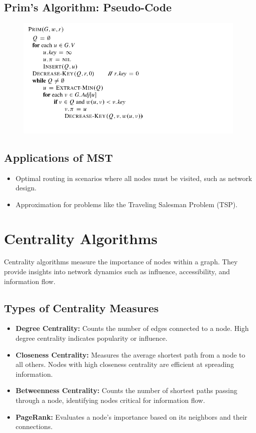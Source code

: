 \subsection{Prim's Algorithm: Pseudo-Code}
 \begin{figure}[H]
     \centering
     \includegraphics[width=0.75\linewidth]{Prim's MSt pseudo.png}

 \end{figure}


\subsection{Applications of MST}
\begin{itemize}
    \item Optimal routing in scenarios where all nodes must be visited, such as network design.
    \item Approximation for problems like the Traveling Salesman Problem (TSP).
\end{itemize}

\section{Centrality Algorithms}

Centrality algorithms measure the importance of nodes within a graph. They provide insights into network dynamics such as influence, accessibility, and information flow.

\subsection{Types of Centrality Measures}
\begin{itemize}
    \item \textbf{Degree Centrality:} Counts the number of edges connected to a node. High degree centrality indicates popularity or influence.
    \item \textbf{Closeness Centrality:} Measures the average shortest path from a node to all others. Nodes with high closeness centrality are efficient at spreading information.
    \item \textbf{Betweenness Centrality:} Counts the number of shortest paths passing through a node, identifying nodes critical for information flow.
    \item \textbf{PageRank:} Evaluates a node's importance based on its neighbors and their connections.
\end{itemize}

